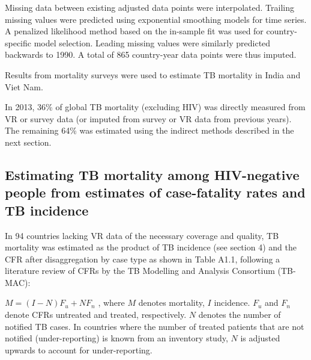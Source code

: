 Missing data between existing adjusted data points were interpolated. Trailing missing values were predicted using exponential smoothing models for time series. A penalized likelihood method based on the in-sample fit was used for country-specific model selection. Leading missing values were similarly predicted backwards to 1990. A total of 865 country-year data points were thus imputed.

Results from mortality surveys were used to estimate TB mortality in India and Viet Nam. 

In 2013, 36\% of global TB mortality (excluding HIV) was directly measured from VR or survey data (or imputed from survey or VR data from previous years). The remaining 64\% was estimated using the indirect methods described in the next section.


\subsection{Estimating TB mortality among HIV-negative people from estimates of case-fatality rates and TB incidence
}

In 94 countries lacking VR data of the necessary coverage and quality, TB mortality was estimated as the product of TB incidence (see section 4) and the CFR after disaggregation by case type as shown in Table A1.1, following a literature review of CFRs by the TB Modelling and Analysis Consortium (TB-MAC):

$M = (I-N)F_u + NF_n$ , where $M$ denotes mortality, $I$ incidence. $F_u$ and $F_n$ denote CFRs untreated and treated, respectively. $N$ denotes the number of notified TB cases. In countries where the number of treated patients that are not notified (under-reporting) is known from an inventory study, $N$ is adjusted upwards to account for under-reporting. 




